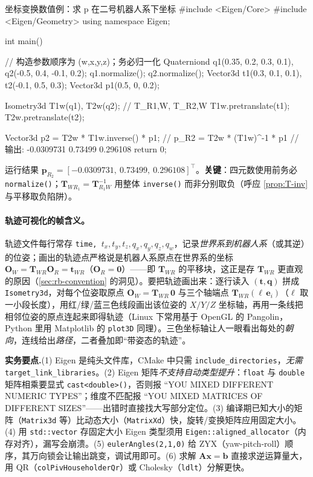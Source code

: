 \begin{codebox}[C++]{坐标变换数值例：求 p 在二号机器人系下坐标}
#include <Eigen/Core>
#include <Eigen/Geometry>
using namespace Eigen;

int main() {
    // 构造参数顺序为 (w,x,y,z)；务必归一化
    Quaterniond q1(0.35, 0.2, 0.3, 0.1), q2(-0.5, 0.4, -0.1, 0.2);
    q1.normalize();
    q2.normalize();
    Vector3d t1(0.3, 0.1, 0.1), t2(-0.1, 0.5, 0.3);
    Vector3d p1(0.5, 0, 0.2);

    Isometry3d T1w(q1), T2w(q2);   // T_{R1,W}, T_{R2,W}
    T1w.pretranslate(t1);
    T2w.pretranslate(t2);

    Vector3d p2 = T2w * T1w.inverse() * p1;   // p_{R2} = T2w * (T1w)^-1 * p1
    // 输出: -0.0309731  0.73499  0.296108
    return 0;
}
\end{codebox}
\noindent 运行结果 $\mathbf{p}_{R_2}=[-0.0309731,\ 0.73499,\ 0.296108]^\top$。\textbf{关键}：四元数使用前务必 \texttt{normalize()}；$\mathbf{T}_{WR_1}=\mathbf{T}_{R_1W}^{-1}$ 用整体 \texttt{inverse()} 而非分别取负（呼应 \cref{prop:T-inv} 与平移取负陷阱）。

\paragraph{轨迹可视化的帧含义。}轨迹文件每行常存 \texttt{time, $t_x,t_y,t_z,q_x,q_y,q_z,q_w$}，记录\emph{世界系到机器人系}（或其逆）的位姿；画出的轨迹点严格说是机器人系原点在世界系的坐标 $\mathbf{O}_W=\mathbf{T}_{WR}\mathbf{O}_R=\mathbf{t}_{WR}$（$\mathbf{O}_R=\mathbf{0}$）——即 $\mathbf{T}_{WR}$ 的平移块，这正是存 $\mathbf{T}_{WR}$ 更直观的原因（\cref{sec:rb-convention} 的洞见）。要把轨迹画出来：逐行读入 $(\mathbf{t},\mathbf{q})$ 拼成 \texttt{Isometry3d}，对每个位姿取原点 $\mathbf{O}_W=\mathbf{T}_{WR}\,\mathbf{0}$ 与三个轴端点 $\mathbf{T}_{WR}(\ell\,\mathbf{e}_i)$（$\ell$ 取一小段长度），用红/绿/蓝三色线段画出该位姿的 $X/Y/Z$ 坐标轴，再用一条线把相邻位姿的原点连起来即得轨迹（Linux 下常用基于 OpenGL 的 Pangolin，Python 里用 Matplotlib 的 \texttt{plot3D} 同理）\cite{gaoxiang2019slam14}。三色坐标轴让人一眼看出每处的\emph{朝向}，连线给出\emph{路径}，二者叠加即“带姿态的轨迹”。

\begin{note}
\textbf{实务要点.}\;(1) Eigen 是纯头文件库，CMake 中只需 \texttt{include\_directories}，\emph{无需} \texttt{target\_link\_libraries}。(2) Eigen 矩阵\emph{不支持自动类型提升}：\texttt{float} 与 \texttt{double} 矩阵相乘要显式 \texttt{cast<double>()}，否则报 “YOU MIXED DIFFERENT NUMERIC TYPES”；维度不匹配报 “YOU MIXED MATRICES OF DIFFERENT SIZES”——出错时直接找大写部分定位。(3) 编译期已知大小的矩阵（\texttt{Matrix3d} 等）比动态大小（\texttt{MatrixXd}）快，旋转/变换矩阵应用固定大小。(4) 用 \texttt{std::vector} 存固定大小 Eigen 类型须用 \texttt{Eigen::aligned\_allocator}（内存对齐），漏写会崩溃。(5) \texttt{eulerAngles(2,1,0)} 给 ZYX（yaw-pitch-roll）顺序，其万向锁会让输出跳变，调试用即可。(6) 求解 $\mathbf{A}\mathbf{x}=\mathbf{b}$ 直接求逆运算量大，用 QR（\texttt{colPivHouseholderQr}）或 Cholesky（\texttt{ldlt}）分解更快。
\end{note}

